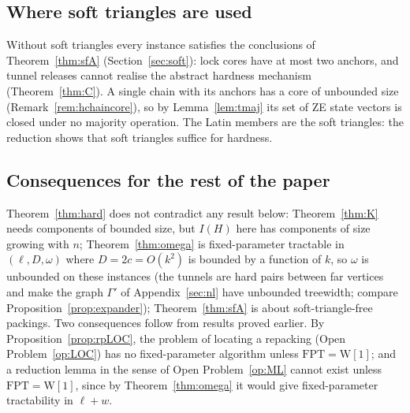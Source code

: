 \subsection{Where soft triangles are used}
Without soft triangles every instance satisfies the conclusions of Theorem~\ref{thm:sfA} (Section~\ref{sec:soft}): lock cores have at most two anchors, and tunnel releases cannot realise the abstract hardness mechanism (Theorem~\ref{thm:C}). A single chain with its anchors has a core of unbounded size (Remark~\ref{rem:hchaincore}), so by Lemma~\ref{lem:tmaj} its set of ZE state vectors is closed under no majority operation. The Latin members are the soft triangles: the reduction shows that soft triangles suffice for hardness.

\subsection{Consequences for the rest of the paper}
Theorem~\ref{thm:hard} does not contradict any result below: Theorem~\ref{thm:K} needs components of bounded size, but $I(H)$ here has components of size growing with $n$; Theorem~\ref{thm:omega} is fixed-parameter tractable in $(\ell,D,\omega)$ where $D=2c=O(k^2)$ is bounded by a function of $k$, so $\omega$ is unbounded on these instances (the tunnels are hard pairs between far vertices and make the graph $\Gamma'$ of Appendix~\ref{sec:nl} have unbounded treewidth; compare Proposition~\ref{prop:expander}); Theorem~\ref{thm:sfA} is about soft-triangle-free packings. Two consequences follow from results proved earlier. By Proposition~\ref{prop:rpLOC}, the problem of locating a repacking (Open Problem~\ref{op:LOC}) has no fixed-parameter algorithm unless $\mathrm{FPT}=\mathrm{W[1]}$; and a reduction lemma in the sense of Open Problem~\ref{op:ML} cannot exist unless $\mathrm{FPT}=\mathrm{W[1]}$, since by Theorem~\ref{thm:omega} it would give fixed-parameter tractability in $\ell+w$.
